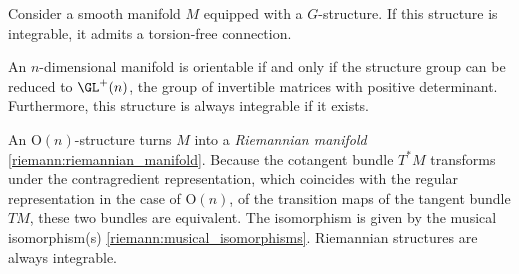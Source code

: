     \begin{property}\label{bundle:integrable_torsion_free}
        Consider a smooth manifold $M$ equipped with a $G$-structure. If this structure is integrable, it admits a torsion-free connection.
    \end{property}

    \begin{example}\label{bundle:orientable_structure}
        An $n$-dimensional manifold is orientable if and only if the structure group can be reduced to $\GL^+(n)$, the group of invertible matrices with positive determinant. Furthermore, this structure is always integrable if it exists.
    \end{example}
    \begin{example}\label{bundle:riemannian_G_structure}
        An $\mathrm{O}(n)$-structure turns $M$ into a \textit{Riemannian manifold} \ref{riemann:riemannian_manifold}. Because the cotangent bundle $T^*M$ transforms under the contragredient representation, which coincides with the regular representation in the case of $\mathrm{O}(n)$, of the transition maps of the tangent bundle $TM$, these two bundles are equivalent. The isomorphism is given by the musical isomorphism(s) \ref{riemann:musical_isomorphisms}. Riemannian structures are always integrable.
    \end{example}

